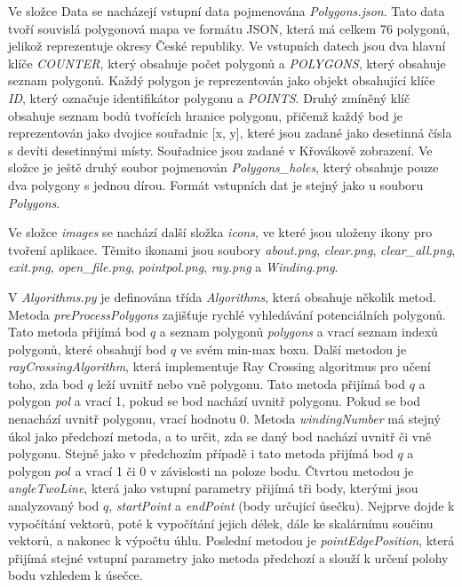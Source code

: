 \documentclass{article}
\begin{document}
\begin{spacing}{1.5}
Ve složce Data se nacházejí vstupní data pojmenována \textit{Polygons.json}. Tato data tvoří souvislá polygonová mapa ve formátu JSON, která má celkem 76 polygonů, jelikož reprezentuje okresy České republiky. Ve vstupních datech jsou dva hlavní klíče \textit{COUNTER}, který obsahuje počet polygonů a \textit{POLYGONS}, který obsahuje seznam polygonů. Každý polygon je reprezentován jako objekt obsahující klíče \textit{ID}, který označuje identifikátor polygonu a \textit{POINTS}. Druhý zmíněný klíč obsahuje seznam bodů tvořících hranice polygonu, přičemž každý bod je reprezentován jako dvojice souřadnic [x, y], které jsou zadané jako desetinná čísla s devíti desetinnými místy. Souřadnice jsou zadané v Křovákově zobrazení. Ve složce je ještě druhý soubor pojmenován \textit{Polygons\_holes}, který obsahuje pouze dva polygony s jednou dírou. Formát vstupních dat je stejný jako u souboru \textit{Polygons}.

Ve složce \textit{images} se nachází další složka \textit{icons}, ve které jsou uloženy ikony pro tvoření aplikace. Těmito ikonami jsou soubory \textit{about.png}, \textit{clear.png}, \textit{clear\_all.png}, \textit{exit.png}, \textit{open\_file.png}, \textit{pointpol.png}, \textit{ray.png} a \textit{Winding.png}. 

V \textit{Algorithms.py} je definována třída \textit{Algorithms}, která obsahuje několik metod. Metoda \textit{preProcessPolygons} zajišťuje rychlé vyhledávání potenciálních polygonů. Tato metoda přijímá bod $q$ a seznam polygonů \textit{polygons} a vrací seznam indexů polygonů, které obsahují bod $q$ ve svém min-max boxu. Další metodou je \textit{rayCrossingAlgorithm}, která implementuje Ray Crossing algoritmus pro učení toho, zda bod $q$ leží uvnitř nebo vně polygonu. Tato metoda přijímá bod $q$ a polygon \textit{pol} a vrací 1, pokud se bod nachází uvnitř polygonu. Pokud se bod nenachází uvnitř polygonu, vrací hodnotu 0. Metoda \textit{windingNumber} má stejný úkol jako předchozí metoda, a to určit, zda se daný bod nachází uvnitř či vně polygonu. Stejně jako v předchozím případě i tato metoda přijímá bod $q$ a polygon $pol$ a vrací 1 či 0 v závislosti na poloze bodu. Čtvrtou metodou je \textit{angleTwoLine}, která jako vstupní parametry přijímá tři body, kterými jsou analyzovaný bod $q$, \textit{startPoint} a \textit{endPoint} (body určující úsečku). Nejprve dojde k vypočítání vektorů, poté k vypočítání jejich délek, dále ke skalárnímu součinu vektorů, a nakonec k výpočtu úhlu. Poslední metodou je \textit{pointEdgePosition}, která přijímá stejné vstupní parametry jako metoda předchozí a slouží k určení polohy bodu vzhledem k úsečce.


\end{spacing}
\end{document}
